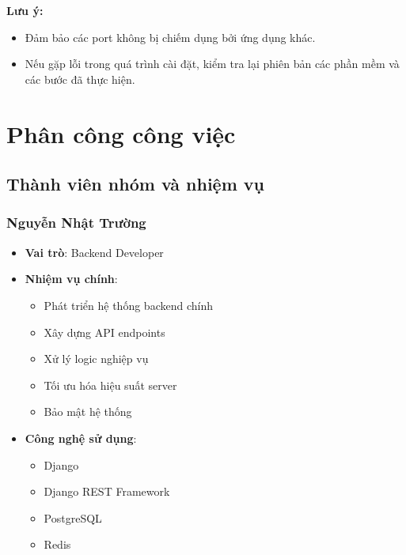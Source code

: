 \documentclass{book}
\let\oldsection\section
\renewcommand{\section}{\clearpage\oldsection}
\begin{document}
\textbf{Lưu ý:}
\begin{itemize}
    \item Đảm bảo các port không bị chiếm dụng bởi ứng dụng khác.
    \item Nếu gặp lỗi trong quá trình cài đặt, kiểm tra lại phiên bản các phần mềm và các bước đã thực hiện.
\end{itemize}

\chapter{Phân công công việc}

\section{Thành viên nhóm và nhiệm vụ}

\subsection{Nguyễn Nhật Trường}
\begin{itemize}
    \item \textbf{Vai trò}: Backend Developer
    \item \textbf{Nhiệm vụ chính}:
    \begin{itemize}
        \item Phát triển hệ thống backend chính
        \item Xây dựng API endpoints
        \item Xử lý logic nghiệp vụ
        \item Tối ưu hóa hiệu suất server
        \item Bảo mật hệ thống
    \end{itemize}
    \item \textbf{Công nghệ sử dụng}:
    \begin{itemize}
        \item Django
        \item Django REST Framework
        \item PostgreSQL
        \item Redis
    \end{itemize}
\end{itemize}
\end{document}
